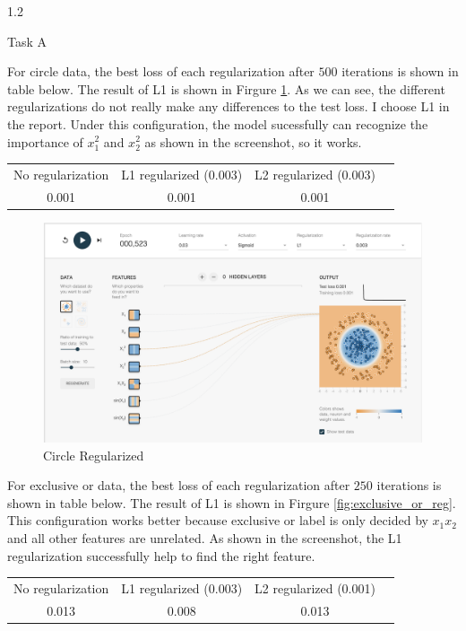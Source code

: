 \documentclass[11pt]{article}
\begin{document}
\begin{enumerate}
1.2
\medskip

Task A
\medskip

For circle data, the best loss of each regularization after $500$ iterations is shown in table below. The result of L1 is shown in Firgure \ref{fig:circle_reg}. As we can see, the different regularizations do not really make any differences to the test loss. I choose L1 in the report. Under this configuration, the model sucessfully can recognize the importance of $x_1^2$ and $x_2^2$ as shown in the screenshot, so it works.

\begin{center}
  \begin{tabular}{ |c|c|c|c| }
   \hline
    No regularization & L1 regularized (0.003) & L2 regularized (0.003) \\
    0.001 & 0.001 & 0.001 \\
    \hline
  \end{tabular}
\end{center}


\begin{figure}[!h]
  \centering
  \includegraphics[width=\linewidth]{figures/1_2/circle.png}
  \caption{Circle Regularized}
  \label{fig:circle_reg}
\end{figure}

For exclusive or data, the best loss of each regularization after $250$ iterations is shown in table below. The result of L1 is shown in Firgure \ref{fig:exclusive_or_reg}. This configuration works better because exclusive or label is only decided by $x_1x_2$ and all other features are unrelated. As shown in the screenshot, the L1 regularization successfully help to find the right feature.

\begin{center}
  \begin{tabular}{ |c|c|c|c| }
   \hline
    No regularization & L1 regularized (0.003) & L2 regularized (0.001) \\
    0.013 & 0.008 & 0.013 \\
    \hline
  \end{tabular}
\end{center}



\end{enumerate}
\end{document}
